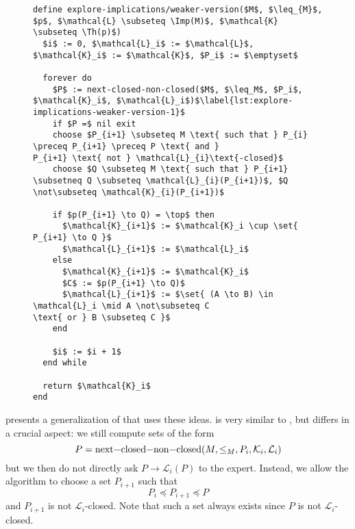 \begin{figure}[tp]
  \begin{Algorithm}
    \label{alg:explore-implications-weaker-version}
    \hspace*{0cm}
\begin{lstlisting}
define explore-implications/weaker-version($M$, $\leq_{M}$, $p$, $\mathcal{L} \subseteq \Imp(M)$, $\mathcal{K} \subseteq \Th(p)$)
  $i$ := 0, $\mathcal{L}_i$ := $\mathcal{L}$, $\mathcal{K}_i$ := $\mathcal{K}$, $P_i$ := $\emptyset$

  forever do
    $P$ := next-closed-non-closed($M$, $\leq_M$, $P_i$, $\mathcal{K}_i$, $\mathcal{L}_i$)$\label{lst:explore-implications-weaker-version-1}$
    if $P =$ nil exit
    choose $P_{i+1} \subseteq M \text{ such that } P_{i} \preceq P_{i+1} \preceq P \text{ and }
P_{i+1} \text{ not } \mathcal{L}_{i}\text{-closed}$
    choose $Q \subseteq M \text{ such that } P_{i+1} \subsetneq Q \subseteq \mathcal{L}_{i}(P_{i+1})$, $Q \not\subseteq \mathcal{K}_{i}(P_{i+1})$

    if $p(P_{i+1} \to Q) = \top$ then
      $\mathcal{K}_{i+1}$ := $\mathcal{K}_i \cup \set{ P_{i+1} \to Q }$
      $\mathcal{L}_{i+1}$ := $\mathcal{L}_i$
    else
      $\mathcal{K}_{i+1}$ := $\mathcal{K}_i$
      $C$ := $p(P_{i+1} \to Q)$
      $\mathcal{L}_{i+1}$ := $\set{ (A \to B) \in \mathcal{L}_i \mid A \not\subseteq C
\text{ or } B \subseteq C }$
    end

    $i$ := $i + 1$
  end while

  return $\mathcal{K}_i$  
end
\end{lstlisting}
  \end{Algorithm}
\end{figure}

 presents a generalization of
 that uses these ideas.
 is very similar to
, but differs in a crucial aspect: we still compute sets of
the form
\begin{equation*}
  P = \text{\lstinline{next-closed-non-closed}}(M, \leq_{M}, P_{i}, \mathcal{K}_{i}, \mathcal{L}_{i})
\end{equation*}
but we then do not directly ask $P \to \mathcal{L}_{i}(P)$ to the expert.  Instead, we
allow the algorithm to choose a set $P_{i+1}$ such that
\begin{equation*}
  P_{i} \preceq P_{i+1} \preceq P
\end{equation*}
and $P_{i+1}$ is not $\mathcal{L}_{i}$-closed.  Note that such a set always exists since
$P$ is not $\mathcal{L}_{i}$-closed.

